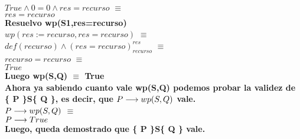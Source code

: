 \documentclass[10pt,a4paper]{article}
\begin{document}
\begin{flushleft}
$True \wedge 0=0 \wedge res=recurso$ $\equiv$\\
\vspace{2mm}
$res=recurso$\\
\vspace{4mm}
\textbf{Resuelvo wp(S1,res=recurso)}\\
\vspace{2mm}
$wp(res:=recurso,res=recurso)$ $\equiv$\\
\vspace{2mm}
$def(recurso) \wedge (res=recurso)_{recurso}^{res}$ $\equiv$\\
\vspace{2mm}
$recurso=recurso$ $\equiv$\\
\vspace{2mm}
$True$\\
\vspace{4mm}
\textbf{Luego wp(S,Q) $\equiv$ True}\\
\vspace{4mm}
\textbf{Ahora ya sabiendo cuanto vale wp(S,Q) podemos probar la validez de \{ P \}S\{ Q \}, es decir, que $P \longrightarrow wp(S,Q)$ vale.} \\
\vspace{2mm}
$P \longrightarrow wp(S,Q)$ $\equiv$\\
\vspace{2mm}
$P \longrightarrow True$\\
\vspace{4mm}
\textbf{Luego, queda demostrado que \{ P \}S\{ Q \} vale.}


\end{flushleft}
\end{document}
